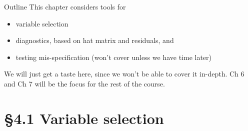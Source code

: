 \documentclass{beamer}
\newcommand{\currentsection}{}
\let\oldsection\section
\renewcommand{\section}[1]{\oldsection{#1}\renewcommand{\currentsection}{#1}}
\begin{document}
\frame{\titlepage}

%
    
\begin{frame}{Outline}
This chapter considers  tools for 
\begin{itemize}
\item variable selection
\item diagnostics,  based on hat matrix and residuals, and
\item  testing mis-specification  (won't cover unless we have time later)
\end{itemize}
\end{frame}

\begin{frame}

We will just get a taste here, since we won't be able to cover it in-depth. Ch 6 and Ch 7 will be the focus for the rest of the course. 

\end{frame}

\section{\S4.1 Variable selection}\label{sec:4.1}
\end{document}
